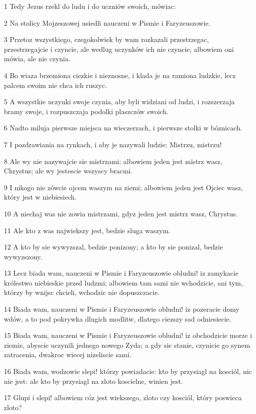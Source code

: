 \par 1 Tedy Jezus rzekl do ludu i do uczniów swoich, mówiac:
\par 2 Na stolicy Mojzeszowej usiedli nauczeni w Pismie i Faryzeuszowie.
\par 3 Przetoz wszystkiego, czegokolwiek by wam rozkazali przestrzegac, przestrzegajcie i czyncie, ale wedlug uczynków ich nie czyncie; albowiem oni mówia, ale nie czynia.
\par 4 Bo wiaza brzemiona ciezkie i nieznosne, i klada je na ramiona ludzkie, lecz palcem swoim nie chca ich ruszyc.
\par 5 A wszystkie uczynki swoje czynia, aby byli widziani od ludzi, i rozszerzaja bramy swoje, i rozpuszczaja podolki plaszczów swoich.
\par 6 Nadto miluja pierwsze miejsca na wieczerzach, i pierwsze stolki w bóznicach.
\par 7 I pozdrawiania na rynkach, i aby je nazywali ludzie: Mistrzu, mistrzu!
\par 8 Ale wy nie nazywajcie sie mistrzami; albowiem jeden jest mistrz wasz, Chrystus; ale wy jestescie wszyscy bracmi.
\par 9 I nikogo nie zówcie ojcem waszym na ziemi; albowiem jeden jest Ojciec wasz, który jest w niebiesiech.
\par 10 A niechaj was nie zowia mistrzami, gdyz jeden jest mistrz wasz, Chrystus.
\par 11 Ale kto z was najwiekszy jest, bedzie sluga waszym.
\par 12 A kto by sie wywyzszal, bedzie ponizony; a kto by sie ponizal, bedzie wywyzszony.
\par 13 Lecz biada wam, nauczeni w Pismie i Faryzeuszowie obludni! iz zamykacie królestwo niebieskie przed ludzmi; albowiem tam sami nie wchodzicie, ani tym, którzy by wnijsc chcieli, wchodzic nie dopuszczacie.
\par 14 Biada wam, nauczeni w Pismie i Faryzeuszowie obludni! iz pozeracie domy wdów, a to pod pokrywka dlugich modlitw, dlatego ciezszy sad odniesiecie.
\par 15 Biada wam, nauczeni w Pismie i Faryzeuszowie obludni! iz obchodzicie morze i ziemie, abyscie uczynili jednego nowego Zyda; a gdy sie stanie, czynicie go synem zatracenia, dwakroc wiecej nizeliscie sami.
\par 16 Biada wam, wodzowie slepi! którzy powiadacie: kto by przysiagl na kosciól, nic nie jest: ale kto by przysiagl na zloto koscielne, winien jest.
\par 17 Glupi i slepi! albowiem cóz jest wiekszego, zloto czy kosciól, który poswieca zloto?
